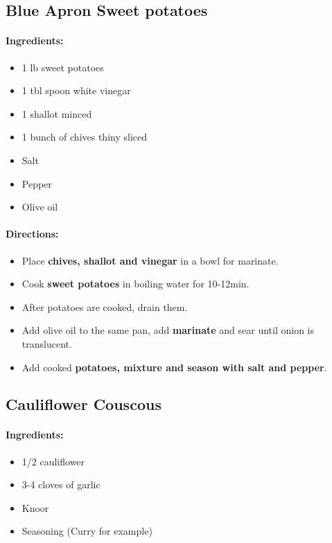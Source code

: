 \documentclass{article}
\begin{document}
\subsection{Blue Apron Sweet potatoes}

\paragraph{Ingredients:}
\begin{itemize}
    \item 1 lb sweet potatoes
    \item 1 tbl spoon white vinegar
    \item 1 shallot minced
    \item 1 bunch of chives thiny sliced
    \item Salt
    \item Pepper
    \item Olive oil
\end{itemize}

\paragraph{Directions:}
\begin{itemize}
    \item Place \textbf{chives, shallot and vinegar} in a bowl for marinate.
    \item Cook \textbf{sweet potatoes} in boiling water for 10-12min.
    \item After potatoes are cooked, drain them.
    \item Add olive oil to the same pan, add \textbf{marinate} and sear until onion is translucent.
    \item Add cooked \textbf{potatoes, mixture and season with salt and pepper}.
\end{itemize}

\subsection{Cauliflower Couscous}

\paragraph{Ingredients:}
\begin{itemize}
    \item 1/2 cauliflower
    \item 3-4 cloves of garlic
    \item Knoor
    \item Seasoning (Curry for example)
\end{itemize}
\end{document}
